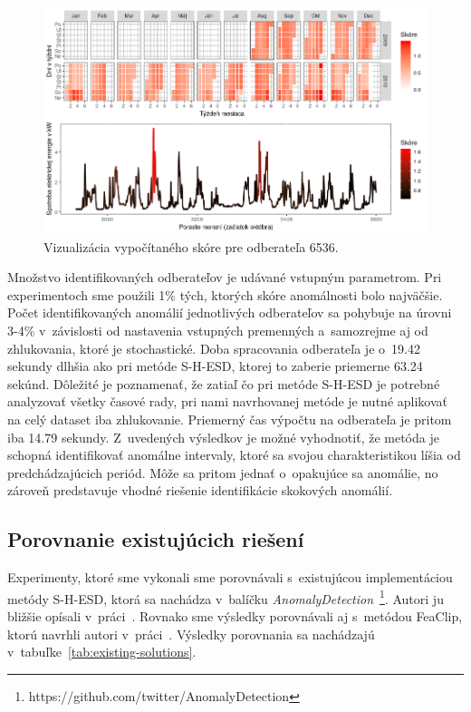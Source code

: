 \documentclass[a4paper,twoside,slovak,12pt,appendix]{article}
\begin{document}
\begin{figure}[H]
  \centering
  \includegraphics[width=\textwidth]{results_my_6536.png}
  \caption{Vizualizácia vypočítaného skóre pre odberateľa 6536.}
	\label{fig:results-my-6536}
\end{figure}

\noindent
Množstvo identifikovaných odberateľov je udávané vstupným parametrom. Pri
experimentoch sme použili 1\% tých, ktorých skóre anomálnosti bolo najväčšie.
Počet identifikovaných anomálií jednotlivých odberateľov sa pohybuje na úrovni
3-4\% v~závislosti od nastavenia vstupných premenných a~samozrejme aj od
zhlukovania, ktoré je stochastické. Doba spracovania odberateľa je o~19.42
sekundy dlhšia ako pri metóde S-H-ESD, ktorej to zaberie priemerne 63.24
sekúnd. Dôležité je poznamenať, že zatiaľ čo pri metóde S-H-ESD je potrebné
analyzovať všetky časové rady, pri nami navrhovanej metóde je nutné aplikovať
na celý dataset iba zhlukovanie. Priemerný čas výpočtu na odberateľa je pritom
iba 14.79 sekundy. Z~uvedených výsledkov je možné vyhodnotiť, že metóda je
schopná identifikovať anomálne intervaly, ktoré sa svojou charakteristikou líšia
od predchádzajúcich periód. Môže sa pritom jednať o~opakujúce sa anomálie, no
zároveň predstavuje vhodné riešenie identifikácie skokových anomálií.

\subsection{Porovnanie existujúcich riešení}
Experimenty, ktoré sme vykonali sme porovnávali s~existujúcou implementáciou
metódy S-H-ESD, ktorá sa nachádza v~balíčku
\textit{AnomalyDetection}~\footnote{https://github.com/twitter/AnomalyDetection}.
Autori ju bližšie opísali v~práci~\cite{Hochenbaum2014}. Rovnako sme výsledky
porovnávali aj s~metódou FeaClip, ktorú navrhli autori
v~práci~\cite{Laurinec2018}. Výsledky porovnania sa nachádzajú
v~tabuľke~\ref{tab:existing-solutions}.
\end{document}
